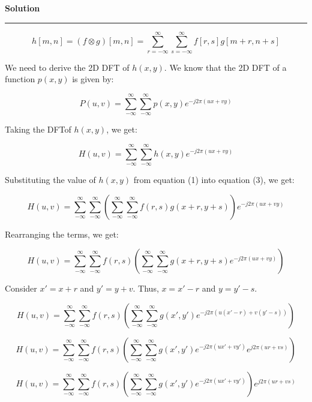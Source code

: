 \documentclass[a4paper]{article}
\newenvironment{solution}[2][]{%
    \begin{mdframed}[linecolor=green!60!black, linewidth=2pt, roundcorner=10pt, backgroundcolor=green!5!white, skipabove=12pt, skipbelow=12pt]%
        \textbf{\large #2} %
        \par\noindent\rule{\textwidth}{0.4pt} %
        \vspace{0.5em} %
}{%
    \end{mdframed}%
}
\begin{document}
\begin{solution}{Solution}
\begin{equation}
    h[m, n] = (f \otimes g)[m, n] = \sum_{r=-\infty}^{\infty} \sum_{s=-\infty}^{\infty} f[r, s]g[m+r, n+s]
\end{equation}

We need to derive the 2D DFT of $h(x, y)$. We know that the 2D DFT of a function $p(x, y)$ is given by: 

\begin{equation}
    P(u, v) = \sum_{-\infty}^{\infty} \sum_{-\infty}^{\infty} p(x, y) e^{-j2\pi(ux+vy)} 
\end{equation}

Taking the DFTof $h(x, y)$, we get:

\begin{equation}
    H(u, v) = \sum_{-\infty}^{\infty} \sum_{-\infty}^{\infty} h(x, y) e^{-j2\pi(ux+vy)}
\end{equation}

Substituting the value of $h(x, y)$ from equation (1) into equation (3), we get:

\begin{equation}
    H(u, v) = \sum_{-\infty}^{\infty} \sum_{-\infty}^{\infty} \left( \sum_{-\infty}^{\infty} \sum_{-\infty}^{\infty} f(r, s)g(x+r, y+s)\right) e^{-j2\pi(ux+vy)}
\end{equation}

Rearranging the terms, we get:

\begin{equation}
    H(u, v) = \sum_{-\infty}^{\infty} \sum_{-\infty}^{\infty} f(r, s) \left( \sum_{-\infty}^{\infty} \sum_{-\infty}^{\infty} g(x+r, y+s) e^{-j2\pi(ux+vy)}\right)
\end{equation}


Consider $x' = x + r$ and $y' = y + v$. Thus, $x = x' - r$ and $y = y' - s$.

\begin{equation}
    H(u, v) = \sum_{-\infty}^{\infty} \sum_{-\infty}^{\infty} f(r, s) \left( \sum_{-\infty}^{\infty} \sum_{-\infty}^{\infty} g(x', y') e^{-j2\pi(u(x'-r)+v(y'-s))} \right)
\end{equation}

\begin{equation}
    H(u, v) = \sum_{-\infty}^{\infty} \sum_{-\infty}^{\infty} f(r, s) \left( \sum_{-\infty}^{\infty} \sum_{-\infty}^{\infty} g(x', y') e^{-j2\pi(ux'+vy')} e^{j2\pi(ur+vs)}\right)
\end{equation}

\begin{equation}
    H(u, v) = \sum_{-\infty}^{\infty} \sum_{-\infty}^{\infty} f(r, s) \left( \sum_{-\infty}^{\infty} \sum_{-\infty}^{\infty} g(x', y') e^{-j2\pi(ux'+vy')}\right) e^{j2\pi(ur+vs)}
\end{equation}


\end{solution}
\end{document}
